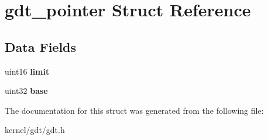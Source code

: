 \hypertarget{structgdt__pointer}{
\section{gdt\_\-pointer Struct Reference}
\label{structgdt__pointer}
}
\subsection*{Data Fields}
\begin{DoxyCompactItemize}
\item 
\hypertarget{structgdt__pointer_aee5d9a20ae7b57a2d573bbfaa9c759bf}{
uint16 {\bfseries limit}}
\label{structgdt__pointer_aee5d9a20ae7b57a2d573bbfaa9c759bf}

\item 
\hypertarget{structgdt__pointer_a85c8c056fbcfadafcd9fcd99334efdac}{
uint32 {\bfseries base}}
\label{structgdt__pointer_a85c8c056fbcfadafcd9fcd99334efdac}

\end{DoxyCompactItemize}


The documentation for this struct was generated from the following file:\begin{DoxyCompactItemize}
\item 
kernel/gdt/gdt.h\end{DoxyCompactItemize}
